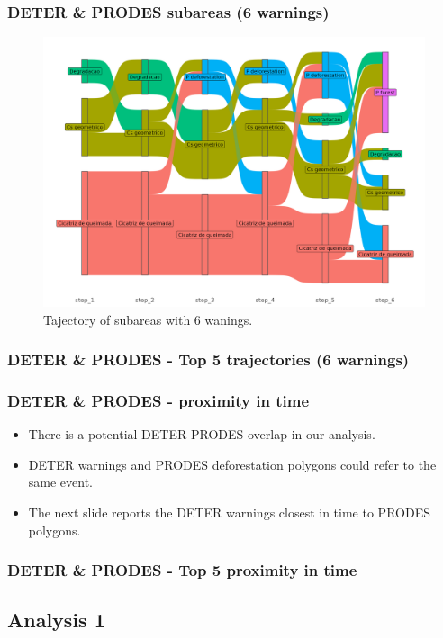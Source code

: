 \documentclass[aspectratio=169]{beamer}
\begin{document}
\begin{frame}
    \frametitle{DETER \& PRODES subareas (6 warnings)}
    \begin{figure}[h] 
        \includegraphics[width=0.65\linewidth]
        {./figures/plot_deter_prodes_subarea_trajectory_6.png}
        \caption{Tajectory of subareas with 6 wanings.}
        \label{fig:deter_prodes_subarea_trajectory_6}
    \end{figure}
\end{frame}

\begin{frame}[allowframebreaks]
    \frametitle{DETER \& PRODES - Top 5 trajectories (6 warnings)}
    
\end{frame}

\begin{frame}[allowframebreaks]
    \frametitle{DETER \& PRODES - proximity in time}
    \begin{itemize}
        \item There is a potential DETER-PRODES overlap in our analysis.
        \item DETER warnings and PRODES deforestation polygons could refer to
            the same event.
        \item The next slide reports the DETER warnings closest in 
            time to PRODES polygons.
    \end{itemize}
\end{frame}

\begin{frame}[allowframebreaks]
    \frametitle{DETER \& PRODES - Top 5 proximity in time}
    
\end{frame}



\subsection{Analysis 1}
\end{document}
